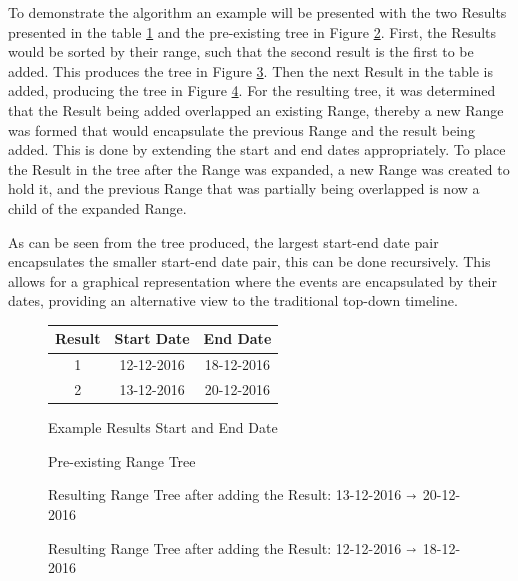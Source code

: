 \par To demonstrate the algorithm an example will be presented with the two Results presented in the table \ref{fig:resultsTable} and the pre-existing tree in Figure \ref{fig:rangeTreePre}. First, the Results would be sorted by their range, such that the second result is the first to be added. This produces the tree in Figure \ref{fig:rangeTree1}. Then the next Result in the table is added, producing the tree in Figure \ref{fig:rangeTree2}. For the resulting tree, it was determined that the Result  being added overlapped an existing Range, thereby a new Range was formed that would encapsulate the previous Range and the result being added. This is done by extending the start and end dates appropriately. To place the Result in the tree after the Range was expanded, a new Range was created to hold it, and the previous Range that was partially being overlapped is now a child of the expanded Range.
\par As can be seen from the tree produced, the largest start-end date pair encapsulates the smaller start-end date pair, this can be done recursively. This allows for a graphical representation where the events are encapsulated by their dates, providing an alternative view to the traditional top-down timeline.
\begin{figure}[h]
\begin{center}
\begin{tabular}{ |c|c|c| } 
 \hline
Result & Start Date & End Date \\
\hline
\hline
1 & 12-12-2016 & 18-12-2016 \\
2 & 13-12-2016 & 20-12-2016 \\
 \hline
\end{tabular}
\end{center}
\caption{Example Results Start and End Date}
\label{fig:resultsTable}
\end{figure}
\begin{figure}[h]
\resizebox{\linewidth}{!}{
\Tree
 [.{01-01-1980  $\shortrightarrow$ 31-12-2016}
	[.{01-01-2008  $\shortrightarrow$ 31-05-2016} {01-01-2015} ]
	[{01-11-2016} ] 
]
}
\caption{Pre-existing Range Tree}
\label{fig:rangeTreePre}
\end{figure}
\begin{figure}[h]
\resizebox{\linewidth}{!}{
\Tree
 [.{01-01-1980 $\shortrightarrow$ 31-12-2016}
	[.{01-01-2008  $\shortrightarrow$ 31-05-2016} {01-01-2015} ]
	[{13-12-2016  $\shortrightarrow$ 20-12-2016} ]
	[{01-11-2016} ] 
]
}
\caption{Resulting Range Tree after adding the Result: 13-12-2016  $\shortrightarrow$ 20-12-2016}
\label{fig:rangeTree1}
\end{figure}
\begin{figure}
\caption{Resulting Range Tree after adding the Result: 12-12-2016 $\shortrightarrow$ 18-12-2016}
\label{fig:rangeTree2}
\end{figure}

